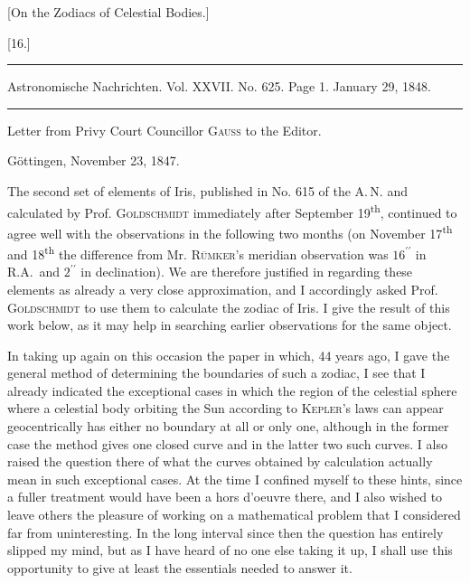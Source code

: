 \begin{center}
[On the Zodiacs of Celestial Bodies.]
\end{center}

\begin{center}
[16.]
\end{center}

\par\noindent\rule{\textwidth}{.3pt}\par

\noindent\small Astronomische Nachrichten. Vol. XXVII. No. 625. Page 1. January 29, 1848.\normalsize

\par\noindent\rule{\textwidth}{.3pt}\par

\begin{center}
Letter from Privy Court Councillor \textsc{Gauss} to the Editor.

Göttingen, November 23, 1847.
\end{center}

The second set of elements of Iris, published in No. 615 of the A.\,N. and calculated by Prof. \textsc{Goldschmidt} immediately after September 19\textsuperscript{th}, continued to agree well with the observations in the following two months (on November 17\textsuperscript{th} and 18\textsuperscript{th} the difference from Mr. \textsc{Rümker}'s meridian observation was \(16^{\prime\prime}\) in R.A.\ and \(2^{\prime\prime}\) in declination). We are therefore justified in regarding these elements as already a very close approximation, and I accordingly asked Prof. \textsc{Goldschmidt} to use them to calculate the zodiac of Iris. I give the result of this work below, as it may help in searching earlier observations for the same object.

In taking up again on this occasion the paper\HistoricalNoteEight{Vol. VI, p. 106.]} in which, 44 years ago, I gave the general method of determining the boundaries of such a zodiac, I see that I already indicated the exceptional cases in which the region of the celestial sphere where a celestial body orbiting the Sun according to \textsc{Kepler}'s laws can appear geocentrically has either no boundary at all or only one, although in the former case the method gives one closed
curve and in the latter two such curves. I also raised the question there of what the curves obtained by calculation actually mean in such exceptional cases. At the time I confined myself to these hints, since a fuller treatment would have been a hors d’oeuvre there, and I also wished to leave others the pleasure of working on a mathematical problem that I considered far from uninteresting. In the long interval since then the question has entirely slipped my mind, but as I have heard of no one else taking it up, I shall use this opportunity to give at least the essentials needed to answer it.

